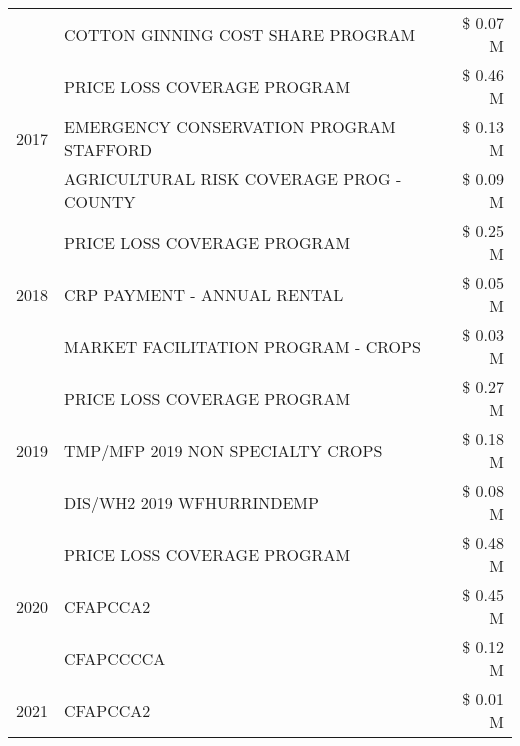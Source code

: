 \begin{tabular}{llr}
 & COTTON GINNING COST SHARE PROGRAM             & \$ 0.07 M \\
\cline{1-3}
\multirow[t]{3}{*}{2017} & PRICE LOSS COVERAGE PROGRAM & \$ 0.46 M \\
 & EMERGENCY CONSERVATION PROGRAM STAFFORD & \$ 0.13 M \\
 & AGRICULTURAL RISK COVERAGE PROG - COUNTY & \$ 0.09 M \\
\cline{1-3}
\multirow[t]{3}{*}{2018} & PRICE LOSS COVERAGE PROGRAM & \$ 0.25 M \\
 & CRP PAYMENT - ANNUAL RENTAL & \$ 0.05 M \\
 & MARKET FACILITATION PROGRAM - CROPS & \$ 0.03 M \\
\cline{1-3}
\multirow[t]{3}{*}{2019} & PRICE LOSS COVERAGE PROGRAM & \$ 0.27 M \\
 & TMP/MFP 2019 NON SPECIALTY CROPS & \$ 0.18 M \\
 & DIS/WH2 2019 WFHURRINDEMP & \$ 0.08 M \\
\cline{1-3}
\multirow[t]{3}{*}{2020} & PRICE LOSS COVERAGE PROGRAM & \$ 0.48 M \\
 & CFAPCCA2 & \$ 0.45 M \\
 & CFAPCCCCA & \$ 0.12 M \\
\cline{1-3}
2021 & CFAPCCA2 & \$ 0.01 M \\
\cline{1-3}
\bottomrule
\end{tabular}
